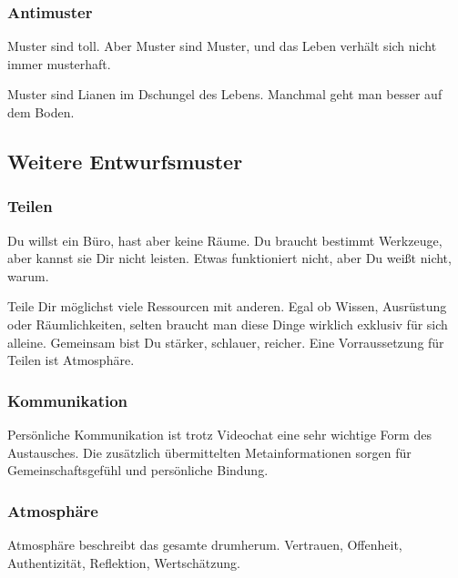 \subsubsection{Antimuster}
\begin{em}
Muster sind toll.
%
Aber Muster sind Muster, und das Leben verhält sich nicht immer musterhaft.
\end{em}
%



Muster sind Lianen im Dschungel des Lebens. Manchmal geht man besser auf dem Boden.





\subsection{Weitere Entwurfsmuster}


\subsubsection{Teilen}
\begin{em}
Du willst ein Büro, hast aber keine Räume.
%
Du braucht bestimmt Werkzeuge, aber kannst sie Dir nicht leisten.
%
Etwas funktioniert nicht, aber Du weißt nicht, warum.
\end{em}



Teile Dir möglichst viele Ressourcen mit anderen.
%
Egal ob Wissen, Ausrüstung oder Räumlichkeiten, selten braucht man diese Dinge wirklich exklusiv für sich alleine.
%
Gemeinsam bist Du stärker, schlauer, reicher.
%
Eine Vorraussetzung für Teilen ist Atmosphäre.


     \subsubsection{Kommunikation}
Persönliche Kommunikation ist trotz Videochat eine sehr wichtige Form des Austausches.
%
Die zusätzlich übermittelten Metainformationen sorgen für Gemeinschaftsgefühl und persönliche Bindung.


   \subsubsection{Atmosphäre}
Atmosphäre beschreibt das gesamte drumherum.
%
Vertrauen, Offenheit, Authentizität, Reflektion, Wertschätzung.



